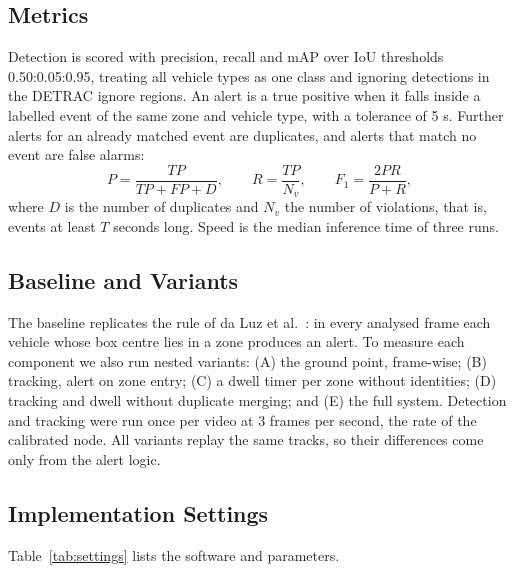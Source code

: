 \documentclass[conference]{IEEEtran}
\begin{document}
\subsection{Metrics}
Detection is scored with precision, recall and mAP over IoU thresholds 0.50:0.05:0.95, treating all vehicle types as one class and ignoring detections in the DETRAC ignore regions. An alert is a true positive when it falls inside a labelled event of the same zone and vehicle type, with a tolerance of 5 s. Further alerts for an already matched event are duplicates, and alerts that match no event are false alarms:
\begin{equation}
P = \frac{TP}{TP + FP + D}, \qquad R = \frac{TP}{N_v}, \qquad F_1 = \frac{2PR}{P + R},
\label{eq:pr}
\end{equation}
where $D$ is the number of duplicates and $N_v$ the number of violations, that is, events at least $T$ seconds long. Speed is the median inference time of three runs.

\subsection{Baseline and Variants}
The baseline replicates the rule of da Luz et al.~\cite{daluz2026}: in every analysed frame each vehicle whose box centre lies in a zone produces an alert. To measure each component we also run nested variants: (A) the ground point, frame-wise; (B) tracking, alert on zone entry; (C) a dwell timer per zone without identities; (D) tracking and dwell without duplicate merging; and (E) the full system. Detection and tracking were run once per video at 3 frames per second, the rate of the calibrated node. All variants replay the same tracks, so their differences come only from the alert logic.

\subsection{Implementation Settings}
Table~\ref{tab:settings} lists the software and parameters.
\end{document}
